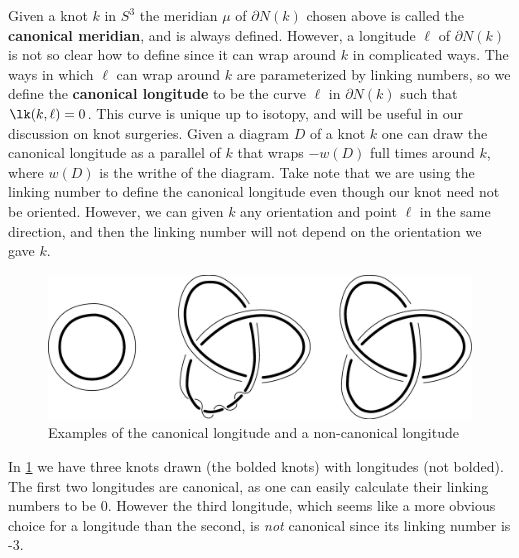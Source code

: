 Given a knot $k$ in $S^3$ the meridian $\mu$ of $\partial N(k)$ chosen above is called the \textbf{canonical meridian}, and is always defined. However, a longitude $\ell$ of $\partial N(k)$ is not so clear how to define since it can wrap around $k$ in complicated ways. The ways in which $\ell$ can wrap around $k$ are parameterized by linking numbers, so we define the \textbf{canonical longitude} to be the curve $\ell$ in $\partial N(k)$ such that $\lk(k,\ell)=0$. This curve is unique up to isotopy, and will be useful in our discussion on knot surgeries. Given a diagram $D$ of a knot $k$ one can draw the canonical longitude as a parallel of $k$ that wraps $-w(D)$ full times around $k$, where $w(D)$ is the writhe of the diagram. Take note that we are using the linking number to define the canonical longitude even though our knot need not be oriented. However, we can given $k$ any orientation and point $\ell$ in the same direction, and then the linking number will not depend on the orientation we gave $k$.

\begin{figure}[tb]
\centering
\includegraphics[scale=.5]{graphics/canonical-longitude}
\caption{Examples of the canonical longitude and a non-canonical longitude}
\label{canonical longitude}
\end{figure}

In \cref{canonical longitude} we have three knots drawn (the bolded knots) with longitudes (not bolded). The first two longitudes are canonical, as one can easily calculate their linking numbers to be 0. However the third longitude, which seems like a more obvious choice for a longitude than the second, is \emph{not} canonical since its linking number is -3.

